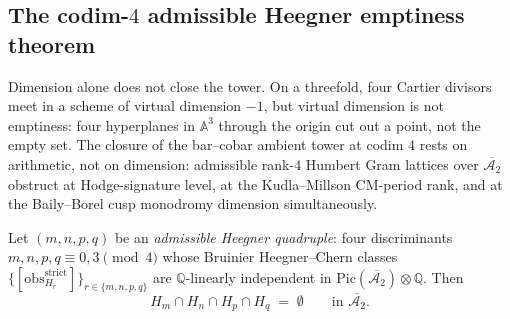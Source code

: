 \subsection{The codim-$4$ admissible Heegner emptiness theorem}
\label{subsec:codim4-admissible-heegner-emptiness}

Dimension alone does not close the tower. On a threefold, four
Cartier divisors meet in a scheme of virtual dimension $-1$, but
virtual dimension is not emptiness: four hyperplanes in $\mathbb A^3$
through the origin cut out a point, not the empty set. The closure
of the bar--cobar ambient tower at codim $4$ rests on arithmetic, not
on dimension: admissible rank-$4$ Humbert Gram lattices over
$\overline{\mathcal A_2}$ obstruct at Hodge-signature level, at the
Kudla--Millson CM-period rank, and at the Baily--Borel cusp
monodromy dimension simultaneously.

\begin{theorem}
\label{thm:codim4-admissible-heegner-emptiness}
\ClaimStatusConditional
{}%
%
%
Let $(m,n,p,q)$ be an \emph{admissible Heegner quadruple}: four
discriminants $m,n,p,q\equiv 0,3\pmod 4$ whose Bruinier
Heegner--Chern classes
$\{[\mathrm{obs}^{\mathrm{strict}}_{H_r}]\}_{r\in\{m,n,p,q\}}$ are
$\mathbb Q$-linearly independent in
$\mathrm{Pic}(\overline{\mathcal A_2})\otimes\mathbb Q$. Then
\[
H_m\cap H_n\cap H_p\cap H_q\;=\;\emptyset
\qquad\text{in }\overline{\mathcal A_2}.
\]
\end{theorem}

